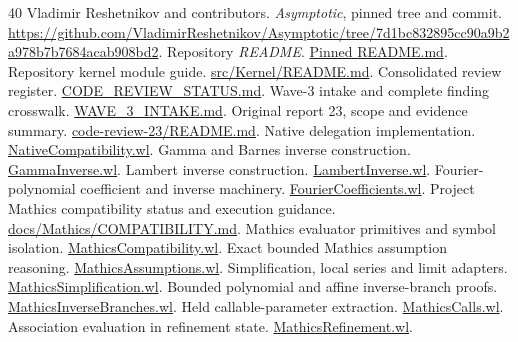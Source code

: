 \documentclass[11pt,letterpaper]{article}
\begin{document}
\clearpage
{}
{}
\begingroup\small
\def\repobase{https://github.com/VladimirReshetnikov/Asymptotic/blob/7d1bc832895cc90a9b2a978b7b7684acab908bd2/}
\begin{thebibliography}{40}
\setlength{\itemsep}{1pt}
\setlength{\parskip}{0pt}
 Vladimir Reshetnikov and contributors. \emph{Asymptotic}, pinned tree and commit. \url{https://github.com/VladimirReshetnikov/Asymptotic/tree/7d1bc832895cc90a9b2a978b7b7684acab908bd2}.
 Repository \emph{README}. \href{\repobase README.md}{Pinned README.md}.
 Repository kernel module guide. \href{\repobase src/Kernel/README.md}{src/Kernel/README.md}.
 Consolidated review register. \href{\repobase docs/development/CODE_REVIEW_STATUS.md}{CODE\_REVIEW\_STATUS.md}.
 Wave-3 intake and complete finding crosswalk. \href{\repobase docs/development/WAVE_3_INTAKE.md}{WAVE\_3\_INTAKE.md}.
 Original report 23, scope and evidence summary. \href{\repobase external-reports/code-review/wave-3/code-review-23/README.md}{code-review-23/README.md}.
 Native delegation implementation. \href{\repobase src/Kernel/NativeCompatibility.wl}{NativeCompatibility.wl}.
 Gamma and Barnes inverse construction. \href{\repobase src/Kernel/GammaInverse.wl}{GammaInverse.wl}.
 Lambert inverse construction. \href{\repobase src/Kernel/LambertInverse.wl}{LambertInverse.wl}.
 Fourier-polynomial coefficient and inverse machinery. \href{\repobase src/Kernel/FourierCoefficients.wl}{FourierCoefficients.wl}.
 Project Mathics compatibility status and execution guidance. \href{\repobase docs/Mathics/COMPATIBILITY.md}{docs/Mathics/COMPATIBILITY.md}.
 Mathics evaluator primitives and symbol isolation. \href{\repobase src/Kernel/MathicsCompatibility.wl}{MathicsCompatibility.wl}.
 Exact bounded Mathics assumption reasoning. \href{\repobase src/Kernel/MathicsAssumptions.wl}{MathicsAssumptions.wl}.
 Simplification, local series and limit adapters. \href{\repobase src/Kernel/MathicsSimplification.wl}{MathicsSimplification.wl}.
 Bounded polynomial and affine inverse-branch proofs. \href{\repobase src/Kernel/MathicsInverseBranches.wl}{MathicsInverseBranches.wl}.
 Held callable-parameter extraction. \href{\repobase src/Kernel/MathicsCalls.wl}{MathicsCalls.wl}.
 Association evaluation in refinement state. \href{\repobase src/Kernel/MathicsRefinement.wl}{MathicsRefinement.wl}.

\end{thebibliography}
\end{document}

